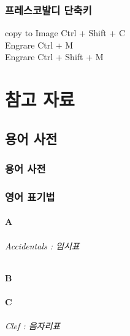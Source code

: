\documentclass[12pt, a4paper, oneside]{book}
\let\stdsection\section
\renewcommand\section{\newpage\stdsection}
\begin{document}
	\section{프레스코발디 단축키}

copy to Image   Ctrl + Shift + C \\
Engrare  	Ctrl + M \\
Engrare  	Ctrl + Shift + M \\




	\part{참고 자료}
	\noptcrule
	\parttoc				


	\chapter{용어 사전}
	\noptcrule
	\parttoc				

	\section{용어 사전}


	\section{영어 표기법}

	\subsection{A}

\paragraph{Accidentals : 임시표}


	\subsection{B}

	\subsection{C}

\paragraph{Clef : 음자리표}
\end{document}

